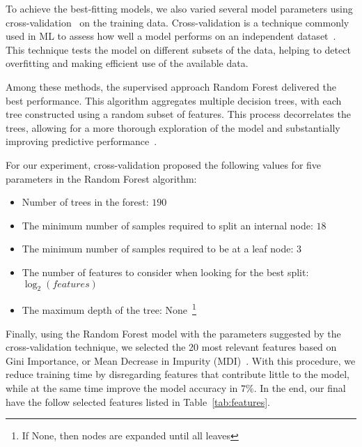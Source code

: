 
To achieve the best-fitting models, we also varied several model parameters using cross-validation~\cite{DBLP:phd/us/Stephenson22} on the training data.
Cross-validation is a technique commonly used in ML to assess how well a model performs on an independent dataset~\cite{DBLP:journals/jsan/AwadF23}.
This technique tests the model on different subsets of the data, helping to detect overfitting and making efficient use of the available data.




{\color{red}
Among these methods, the supervised approach Random Forest delivered the best performance. This algorithm aggregates multiple decision trees,
with each tree constructed using a random subset of features. This process decorrelates the trees, allowing for a more thorough
exploration of the model and substantially improving predictive performance~\cite{james2023introduction}.

For our experiment, cross-validation proposed the following values for five parameters in the Random Forest algorithm:


\begin{itemize}
    \item Number of trees in the forest: $190$
    \item The minimum number of samples required to split an internal node: $18$
    \item The minimum number of samples required to be at a leaf node: $3$
    \item The number of features to consider when looking for the best split: $\log_2(features)$
    \item The maximum depth of the tree: None~\footnote{If None, then nodes are expanded until all leaves}
\end{itemize}

Finally, using the Random Forest model with the parameters suggested by the cross-validation technique, we selected the 20 most relevant features based on Gini Importance, or Mean Decrease in Impurity (MDI)~\cite{james2023introduction}. With this procedure, we reduce training time by disregarding features that contribute little to the model, while at the same time improve the model accuracy in $7\%$. In the end, our final \fds have the follow selected features listed in Table~\ref{tab:features}.
}

